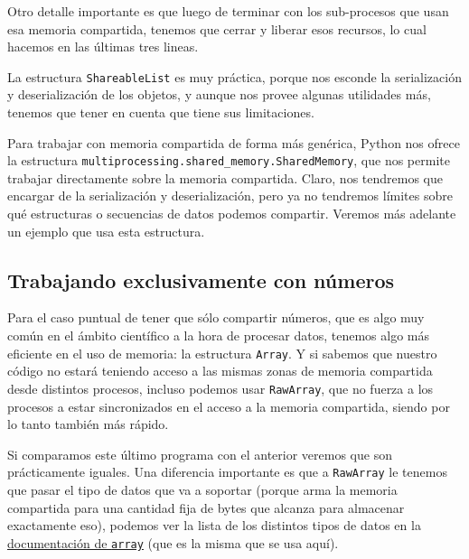 Otro detalle importante es que luego de terminar con los sub-procesos que usan esa memoria compartida, tenemos que cerrar y liberar esos recursos, lo cual hacemos en las últimas tres lineas.


La estructura \texttt{ShareableList} es muy práctica, porque nos esconde la serialización y deserialización de los objetos, y aunque nos provee algunas utilidades más, tenemos que tener en cuenta que tiene sus limitaciones.

Para trabajar con memoria compartida de forma más genérica, Python nos ofrece la estructura \texttt{multiprocessing.shared\_memory.SharedMemory}, que nos permite trabajar directamente sobre la memoria compartida. Claro, nos tendremos que encargar de la serialización y deserialización, pero ya no tendremos límites sobre qué estructuras o secuencias de datos podemos compartir. Veremos más adelante un ejemplo que usa esta estructura.


\subsection{Trabajando exclusivamente con números}

Para el caso puntual de tener que sólo compartir números, que es algo muy común en el ámbito científico a la hora de procesar datos, tenemos algo más eficiente en el uso de memoria: la estructura \texttt{Array}. Y si sabemos que nuestro código no estará teniendo acceso a las mismas zonas de memoria compartida desde distintos procesos, incluso podemos usar \texttt{RawArray}, que no fuerza a los procesos a estar sincronizados en el acceso a la memoria compartida, siendo por lo tanto también más rápido.


Si comparamos este último programa con el anterior veremos que son prácticamente iguales. Una diferencia importante es que a \texttt{RawArray} le tenemos que pasar el tipo de datos que va a soportar (porque arma la memoria compartida para una cantidad fija de bytes que alcanza para almacenar exactamente eso), podemos ver la lista de los distintos tipos de datos en la \href{https://docs.python.org/es/dev/library/array.html#module-array}{documentación de \texttt{array}} (que es la misma que se usa aquí).

